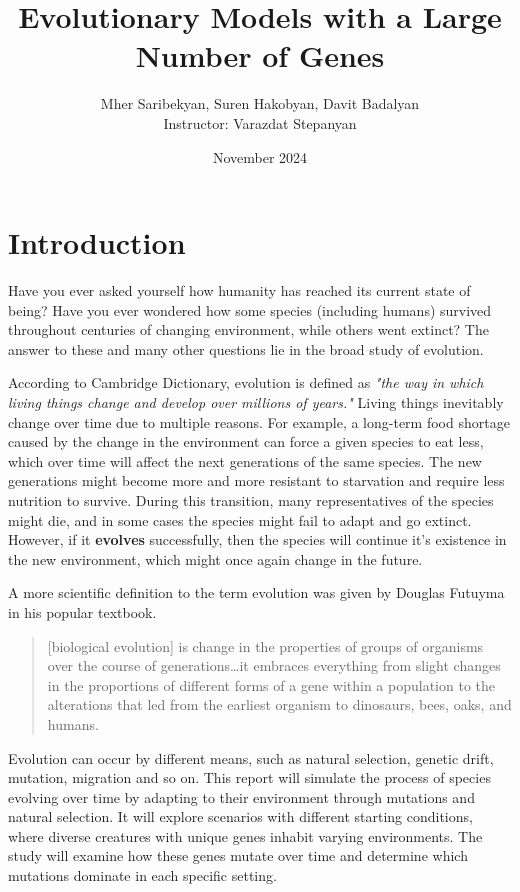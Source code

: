 \documentclass{article}
\title{Evolutionary Models with a Large Number of Genes}
\author{
    Mher Saribekyan, Suren Hakobyan, Davit Badalyan\\
    Instructor: Varazdat Stepanyan 
}
\affil{American University of Armenia}
\date{November 2024}
\begin{document}
\maketitle
\newpage
\tableofcontents
\newpage

\section{Introduction}
Have you ever asked yourself how humanity has reached its current state of being? Have you ever wondered how some species (including humans) survived throughout centuries of changing environment, while others went extinct? The answer to these and many other questions lie in the broad study of evolution. 

According to Cambridge Dictionary, evolution is defined as \textit{"the way in which living things change and develop over millions of years."} Living things inevitably change over time due to multiple reasons. For example, a long-term food shortage caused by the change in the environment can force a given species to eat less, which over time will affect the next generations of the same species. The new generations might become more and more resistant to starvation and require less nutrition to survive. During this transition, many representatives of the species might die, and in some cases the species might fail to adapt and go extinct. However, if it \textbf{evolves} successfully, then the species will continue it's existence in the new environment, which might once again change in the future. 

A more scientific definition to the term evolution was given by Douglas Futuyma in his popular textbook.

\begin{quotation}
    [biological evolution] is change in the properties of groups of organisms over the course of generations…it embraces everything from slight changes in the proportions of different forms of a gene within a population to the alterations that led from the earliest organism to dinosaurs, bees, oaks, and humans.
\end{quotation}

Evolution can occur by different means, such as natural selection, genetic drift, mutation, migration and so on. This report will simulate the process of species evolving over time by adapting to their environment through mutations and natural selection. It will explore scenarios with different starting conditions, where diverse creatures with unique genes inhabit varying environments. The study will examine how these genes mutate over time and determine which mutations dominate in each specific setting.
\end{document}
